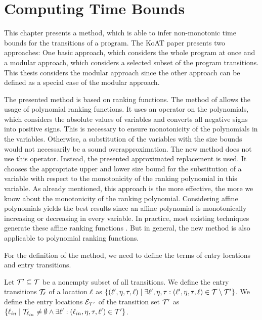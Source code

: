 \chapter{Computing Time Bounds}

This chapter presents a method, which is able to infer non-monotonic time bounds for the transitions of a program.
The KoAT paper \cite{koat} presents two approaches: One basic approach, which considers the whole program at once and a modular approach, which considers a selected subset of the program transitions.
This thesis considers the modular approach since the other approach can be defined as a special case of the modular approach.

The presented method is based on ranking functions.
The method of \cite{koat} allows the usage of polynomial ranking functions.
It uses an operator on the polynomials, which considers the absolute values of variables and converts all negative signs into positive signs.
This is necessary to ensure monotonicity of the polynomials in the variables.
Otherwise, a substitution of the variables with the size bounds would not necessarily be a sound overapproximation.
The new method does not use this operator.
Instead, the presented approximated replacement is used.
It chooses the appropriate upper and lower size bound for the substitution of a variable with respect to the monotonicity of the ranking polynomial in this variable.
As already mentioned, this approach is the more effective, the more we know about the monotonicity of the ranking polynomial.
Considering affine polynomials yields the best results since an affine polynomial is monotonically increasing or decreasing in every variable.
In practice, most existing techniques generate these affine ranking functions \cite{podelski2004prf, bradley2005linear, bagnara2012new, leike2014ranking, ben2013linear}.
But in general, the new method is also applicable to polynomial ranking functions.

For the definition of the method, we need to define the terms of entry locations and entry transitions.
\begin{definition}
  Let $\mathcal{T}' \subseteq \mathcal{T}$ be a nonempty subset of all transitions.
  We define the entry transitions $\mathcal{T}_{\ell}$ of a location $\ell$ as $\lbrace (\ell', \eta, \tau, \ell) \mid \exists \ell', \eta, \tau: (\ell', \eta, \tau, \ell) \in \mathcal{T} \setminus \mathcal{T}' \rbrace$.
  We define the entry locations $\mathcal{E}_{\mathcal{T}'}$ of the transition set $\mathcal{T}'$ as $\lbrace \ell_{in} \mid \mathcal{T}_{\ell_{in}} \neq \emptyset \wedge \exists \ell': (\ell_{in}, \eta, \tau, \ell') \in \mathcal{T}' \rbrace$.
\end{definition}

